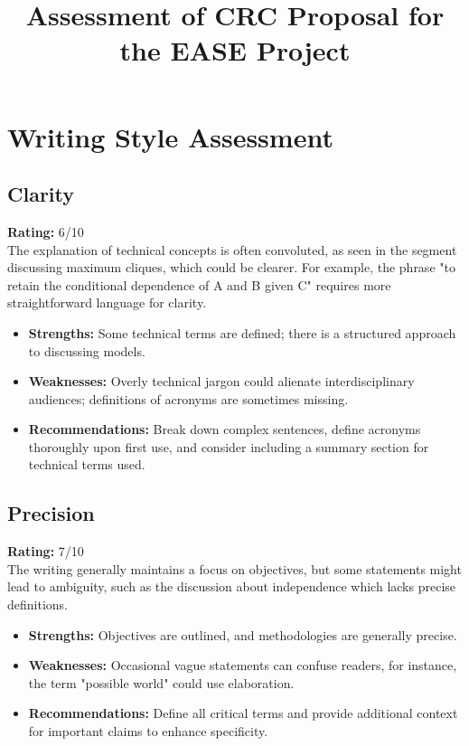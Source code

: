 \documentclass[11pt]{article}
\title{Assessment of CRC Proposal for the EASE Project}
\author{}
\date{}
\begin{document}
\maketitle

\section{Writing Style Assessment}

\subsection{Clarity}
\textbf{Rating:} 6/10 \\
The explanation of technical concepts is often convoluted, as seen in the segment discussing maximum cliques, which could be clearer. For example, the phrase "to retain the conditional dependence of A and B given C" requires more straightforward language for clarity. 
\begin{itemize}
    \item \textbf{Strengths:} Some technical terms are defined; there is a structured approach to discussing models.
    \item \textbf{Weaknesses:} Overly technical jargon could alienate interdisciplinary audiences; definitions of acronyms are sometimes missing.
    \item \textbf{Recommendations:} Break down complex sentences, define acronyms thoroughly upon first use, and consider including a summary section for technical terms used.
\end{itemize}

\subsection{Precision}
\textbf{Rating:} 7/10 \\
The writing generally maintains a focus on objectives, but some statements might lead to ambiguity, such as the discussion about independence which lacks precise definitions.
\begin{itemize}
    \item \textbf{Strengths:} Objectives are outlined, and methodologies are generally precise.
    \item \textbf{Weaknesses:} Occasional vague statements can confuse readers, for instance, the term "possible world" could use elaboration.
    \item \textbf{Recommendations:} Define all critical terms and provide additional context for important claims to enhance specificity.
\end{itemize}
\end{document}
